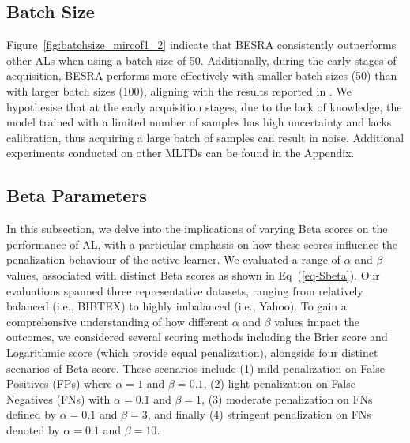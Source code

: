 \documentclass[letterpaper]{article} %
\begin{document}
\subsection{Batch Size}
Figure~\ref{fig:batchsize_mircof1_2} indicate that BESRA consistently outperforms other ALs when using a batch size of 50. 
Additionally, during the early stages of acquisition, BESRA performs more effectively with smaller batch sizes (50) than with larger batch sizes (100), aligning with the results reported in \cite{TanDuBun-IEEEPAMI23, NEURIPS2019_95323660}.
We hypothesise that at the early acquisition stages, due to the lack of knowledge, the model trained with a limited number of samples has high uncertainty and lacks calibration, thus acquiring a large batch of samples can result in noise. Additional experiments conducted on other MLTDs can be found in the Appendix.


\subsection{Beta Parameters}

In this subsection, we delve into the implications of varying Beta scores on the performance of AL, with a particular emphasis on how these scores influence the penalization behaviour of the active learner. 
We evaluated a range of $\alpha$ and $\beta$ values, associated with distinct Beta scores as shown in Eq~(\ref{eq-Sbeta}). 
Our evaluations spanned three representative datasets, ranging from relatively balanced (i.e., BIBTEX) to highly imbalanced (i.e., Yahoo). To gain a comprehensive understanding of how different $\alpha$ and $\beta$ values impact the outcomes, we considered several scoring methods including the Brier score and Logarithmic score (which provide equal penalization), alongside four distinct scenarios of Beta score. These scenarios include (1) mild penalization on False Positives (FPs) where $\alpha=1$ and $\beta=0.1$, (2) light penalization on False Negatives (FNs) with $\alpha=0.1$ and $\beta=1$, (3) moderate penalization on FNs defined by $\alpha=0.1$ and $\beta=3$, and finally (4) stringent penalization on FNs denoted by $\alpha=0.1$ and $\beta=10$.
\end{document}
